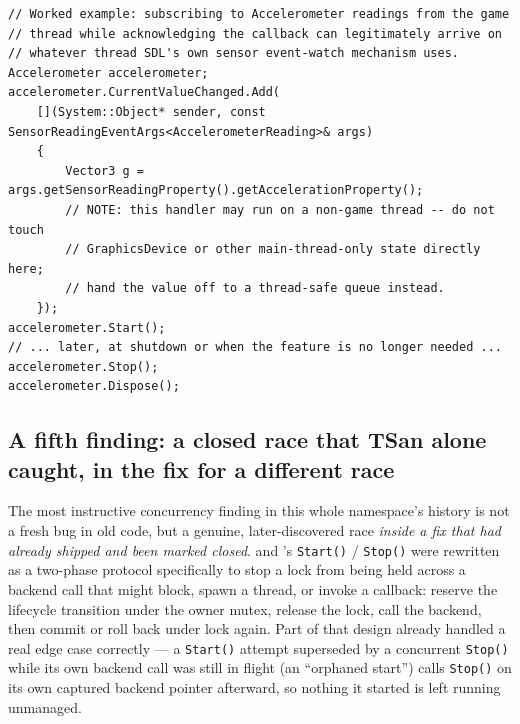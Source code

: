 \begin{lstlisting}
// Worked example: subscribing to Accelerometer readings from the game
// thread while acknowledging the callback can legitimately arrive on
// whatever thread SDL's own sensor event-watch mechanism uses.
Accelerometer accelerometer;
accelerometer.CurrentValueChanged.Add(
    [](System::Object* sender, const SensorReadingEventArgs<AccelerometerReading>& args)
    {
        Vector3 g = args.getSensorReadingProperty().getAccelerationProperty();
        // NOTE: this handler may run on a non-game thread -- do not touch
        // GraphicsDevice or other main-thread-only state directly here;
        // hand the value off to a thread-safe queue instead.
    });
accelerometer.Start();
// ... later, at shutdown or when the feature is no longer needed ...
accelerometer.Stop();
accelerometer.Dispose();
\end{lstlisting}

\subsection{A fifth finding: a closed race that TSan alone caught, in the fix for a different race}

The most instructive concurrency finding in this whole namespace's history is not a fresh bug
in old code, but a genuine, later-discovered race \emph{inside a fix that had already shipped
and been marked closed}.  and 's \texttt{Start()} /
\texttt{Stop()} were rewritten as a two-phase protocol specifically to stop a lock from being
held across a backend call that might block, spawn a thread, or invoke a callback: reserve the
lifecycle transition under the owner mutex, release the lock, call the backend, then commit or
roll back under lock again. Part of that design already handled a real edge case correctly ---
a \texttt{Start()} attempt superseded by a concurrent \texttt{Stop()} while its own backend
call was still in flight (an ``orphaned start'') calls \texttt{Stop()} on its own captured
backend pointer afterward, so nothing it started is left running unmanaged.

